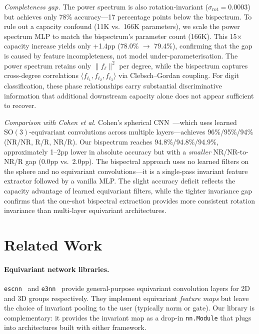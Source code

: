 \documentclass{article}
\newcommand{\SO}{\mathrm{SO}}
\begin{document}
\emph{Completeness gap.}
The power spectrum is also rotation-invariant ($\sigma_{\mathrm{rot}} =
0.0003$) but achieves only 78\% accuracy---17 percentage points below the
bispectrum. To rule out a capacity confound (11K vs.\ 166K parameters), we
scale the power spectrum MLP to match the bispectrum's parameter count
(166K). This 15$\times$ capacity increase yields only +1.4pp (78.0\%
$\to$ 79.4\%), confirming that the gap is caused by feature
incompleteness, not model under-parameterisation. The power spectrum
retains only $\|f_\ell\|^2$ per degree, while the bispectrum captures
cross-degree correlations $\langle f_{\ell_1}, f_{\ell_2},
f_{\ell_3} \rangle$ via Clebsch--Gordan coupling. For digit
classification, these phase relationships carry substantial discriminative
information that additional downstream capacity alone does not appear
sufficient to recover.

\emph{Comparison with Cohen et al.}
Cohen's spherical CNN~\cite{cohen2018spherical}---which uses learned
$\SO(3)$-equivariant convolutions across multiple layers---achieves
96\%/95\%/94\% (NR/NR, R/R, NR/R). Our bispectrum reaches
94.8\%/94.8\%/94.9\%, approximately 1--2pp lower in absolute accuracy but
with a \emph{smaller} NR/NR-to-NR/R gap (0.0pp vs.\ 2.0pp). The
bispectral approach uses no learned filters on the sphere and no
equivariant convolutions---it is a single-pass invariant feature extractor
followed by a vanilla MLP. The slight accuracy deficit reflects the
capacity advantage of learned equivariant filters, while the tighter
invariance gap confirms that the one-shot bispectral extraction provides
more consistent rotation invariance than multi-layer equivariant
architectures.


\section{Related Work}
\label{sec:related}

\paragraph{Equivariant network libraries.}
\texttt{escnn}~\citep{cesa2022program} and \texttt{e3nn}~\citep{geiger2022e3nn}
provide general-purpose equivariant convolution layers for 2D and 3D
groups respectively. They implement equivariant \emph{feature maps} but
leave the choice of invariant pooling to the user (typically norm or
gate). Our library is complementary: it provides the invariant map as a
drop-in \texttt{nn.Module} that plugs into architectures built with either
framework.
\end{document}
